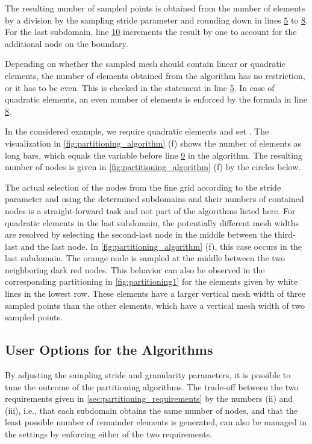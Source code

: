 The resulting number of sampled points is obtained from the number of elements by a division by the sampling stride parameter and rounding down in lines \hyperlink{alg:4.5}{5} to \hyperlink{alg:4.8}{8}. For the last subdomain, line \hyperlink{alg:4.10}{10} increments the result by one to account for the additional node on the boundary.

Depending on whether the sampled mesh should contain linear or quadratic elements, the number of elements obtained from the algorithm has no restriction, or it has to be even. This is checked in the  statement in line \hyperlink{alg:4.5}{5}. In case of quadratic elements, an even number of elements is enforced by the formula in line \hyperlink{alg:4.8}{8}.

In the considered example, we require quadratic elements and set . The visualization in \cref{fig:partitioning_algorithm} (f) shows the number of elements as long bars, which equals the  variable before line \hyperlink{alg:4.9}{9} in the algorithm. The resulting number of nodes is given in \cref{fig:partitioning_algorithm} (f) by the circles below.

The actual selection of the nodes from the fine grid according to the stride parameter and using the determined subdomains and their numbers of contained nodes is a straight-forward task and not part of the algorithms listed here. For quadratic elements in the last subdomain, the potentially different mesh widths are resolved by selecting the second-last node in the middle between the third-last and the last node. In \cref{fig:partitioning_algorithm} (f), this case occurs in the last subdomain. The orange node is sampled at the middle between the two neighboring dark red nodes. This behavior can also be observed in the corresponding partitioning in \cref{fig:partitioning1} for the elements given by white lines in the lowest row. These elements have a larger vertical mesh width of three sampled points than the other elements, which have a vertical mesh width of two sampled points.

\subsection{User Options for the Algorithms}\label{sec:partitioning_user_options}

By adjusting the sampling stride and granularity parameters, it is possible to tune the outcome of the partitioning algorithms.
The trade-off between the two requirements given in \cref{sec:partitioning_requirements} by the numbers (ii) and (iii), i.e., that each subdomain obtains the same number of nodes, and that the least possible number of remainder elements is generated, can also be managed in the settings by enforcing either of the two requirements.


